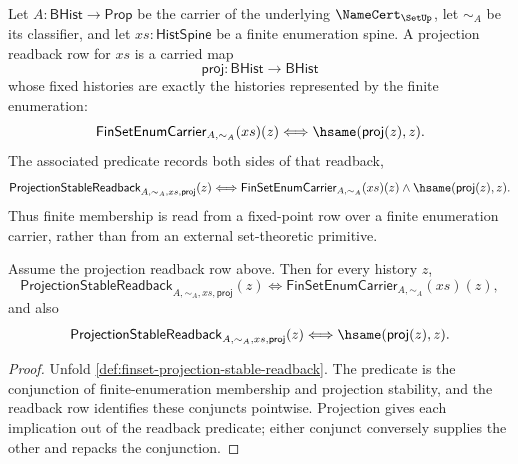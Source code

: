 \begin{definition}
\label{def:finset-projection-stable-readback}
Let $A:\mathsf{BHist}\to\mathsf{Prop}$ be the carrier of the underlying $\NameCert_{\SetUp}$, let $\sim_A$ be its classifier, and let $xs:\mathsf{HistSpine}$ be a finite enumeration spine. A projection readback row for $xs$ is a carried map
$$
\mathsf{proj}:\mathsf{BHist}\to\mathsf{BHist}
$$
whose fixed histories are exactly the histories represented by the finite enumeration:
$$
\mathsf{FinSetEnumCarrier}_{A,\sim_A}(xs)(z)
\Longleftrightarrow
\hsame(\mathsf{proj}(z),z).
$$
The associated predicate records both sides of that readback,
$$
\mathsf{ProjectionStableReadback}_{A,\sim_A,xs,\mathsf{proj}}(z)
\Longleftrightarrow
\mathsf{FinSetEnumCarrier}_{A,\sim_A}(xs)(z)
\land
\hsame(\mathsf{proj}(z),z).
$$
Thus finite membership is read from a fixed-point row over a finite enumeration carrier, rather than from an external set-theoretic primitive.
\end{definition}

\begin{theorem}
\label{thm:finset-projection-stable-readback-membership}
Assume the projection readback row above. Then for every history $z$,
$$
\mathsf{ProjectionStableReadback}_{A,\sim_A,xs,\mathsf{proj}}(z)
\Longleftrightarrow
\mathsf{FinSetEnumCarrier}_{A,\sim_A}(xs)(z),
$$
and also
$$
\mathsf{ProjectionStableReadback}_{A,\sim_A,xs,\mathsf{proj}}(z)
\Longleftrightarrow
\hsame(\mathsf{proj}(z),z).
$$
\end{theorem}
\begin{proof}
Unfold \autoref{def:finset-projection-stable-readback}. The predicate is the conjunction of finite-enumeration membership and projection stability, and the readback row identifies these conjuncts pointwise. Projection gives each implication out of the readback predicate; either conjunct conversely supplies the other and repacks the conjunction.
\end{proof}

